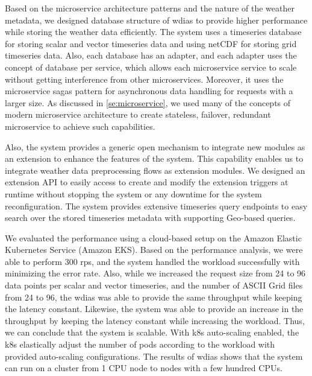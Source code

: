 Based on the microservice architecture patterns and the nature of the weather metadata, we designed database structure of \acrshort{wdias} to provide higher performance while storing the weather data efficiently. The system uses a timeseries database for storing scalar and vector timeseries data and using netCDF for storing grid timeseries data. Also, each database has an adapter, and each adapter uses the concept of database per service, which allows each microservice service to scale without getting interference from other microservices.
Moreover, it uses the microservice sagas pattern for asynchronous data handling for requests with a larger size. As discussed in \cref{se:microservice}, we used many of the concepts of modern microservice architecture to create stateless, failover, redundant microservice to achieve such capabilities.

Also, the system provides a generic open mechanism to integrate new modules as an extension to enhance the features of the system. This capability enables us to integrate weather data preprocessing flows as extension modules.
We designed an extension API to easily access to create and modify the extension triggers at runtime without stopping the system or any downtime for the system reconfiguration. The system provides extensive timeseries query endpoints to easy search over the stored timeseries metadata with supporting Geo-based queries.

We evaluated the performance using a cloud-based setup on the Amazon Elastic Kubernetes Service (Amazon EKS). %
Based on the performance analysis, we were able to perform 300 \acrshort{rps}, and the system handled the workload successfully with minimizing the error rate. Also, while we increased the request size from 24 to 96 data points per scalar and vector timeseries, and the number of ASCII Grid files from 24 to 96, the \acrshort{wdias} was able to provide the same throughput while keeping the latency constant. Likewise, the system was able to provide an increase in the throughput by keeping the latency constant while increasing the workload. Thus, we can conclude that the system is scalable. With \acrshort{k8s} auto-scaling enabled, the \acrshort{k8s} elastically adjust the number of pods according to the workload with provided auto-scaling configurations. The results of \acrshort{wdias} shows that the system can run on a cluster from 1 CPU node to nodes with a few hundred CPUs.
